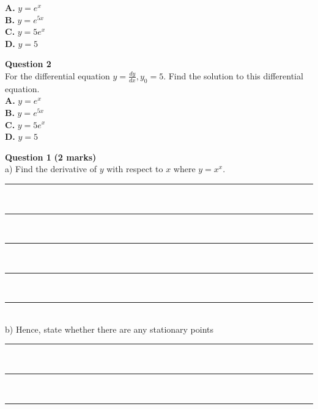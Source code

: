 \documentclass[a4paper,12pt]{article}
\begin{document}
\noindent \textbf{A.} \( y = e^x \) \\[0.3cm]
\textbf{B.} \( y = e^{5x} \) \\[0.3cm]
\textbf{C.} \( y = 5e^x \) \\[0.3cm]
\textbf{D.} \( y = 5 \)

\newpage

\noindent \textbf{Question 2} \\[0.3cm]
For the differential equation \( y = \frac{dy}{dx}, y_0 = 5 \). Find the solution to this differential equation. \\[0.3cm]

\noindent \textbf{A.} \( y = e^x \) \\[0.3cm]
\textbf{B.} \( y = e^{5x} \) \\[0.3cm]
\textbf{C.} \( y = 5e^x \) \\[0.3cm]
\textbf{D.} \( y = 5 \)


\begin{center}
\end{center}
\vspace{1.5cm}
\noindent \textbf{Question 1} \hfill \textbf{(2 marks)} \\[0.3cm]
a) Find the derivative of \( y \) with respect to \( x \) where \( y = x^x \). \hfill {} \\[1cm]
\rule{\textwidth}{0.5pt} \\[0.7cm]
\rule{\textwidth}{0.5pt} \\[0.7cm]
\rule{\textwidth}{0.5pt} \\[0.7cm]
\rule{\textwidth}{0.5pt} \\[0.7cm]
\rule{\textwidth}{0.5pt} \\[1.5cm]
\noindent b) Hence, state whether there are any stationary points \hfill {} \\[1cm]
\rule{\textwidth}{0.5pt} \\[0.7cm]
\rule{\textwidth}{0.5pt} \\[0.7cm]
\rule{\textwidth}{0.5pt} \\[2cm]
\end{document}
